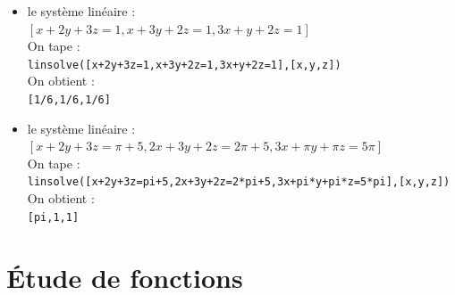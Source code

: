 \documentclass[a4paper,11pt]{book}
\begin{document}
\begin{itemize}
On obtient si on a coch\'e {\tt All\_trig\_sol} dans la configuration du CAS :\\
{\tt [(6*n\_6*pi+pi)/3,(6*n\_6*pi-pi)/3,(6*n\_7*pi+2*pi)/3,\\
(6*n\_7*pi-2*pi)/3,(16*n\_8*pi+pi)/8,(16*n\_8*pi-pi)/8,\\
(16*n\_9*pi+7*pi)/8,(16*n\_9*pi-7*pi)/8,(16*n\_10*pi+3*pi)/8,\\
(16*n\_10*pi-3*pi)/8,(16*n\_11*pi+5*pi)/8,(16*n\_11*pi-5*pi)/8]}
\item le syst\`eme lin\'eaire :\\
$[x+2y+3z=1,x+3y+2z=1,3x+y+2z=1]$\\
On tape :\\
{\tt linsolve([x+2y+3z=1,x+3y+2z=1,3x+y+2z=1],[x,y,z])}\\
On obtient :\\
{\tt [1/6,1/6,1/6]}
\item le syst\`eme lin\'eaire :\\
$[x+2y+3z=\pi+5,2x+3y+2z=2\pi+5,3x+\pi y+\pi z=5\pi]$\\
On tape :\\
{\tt linsolve([x+2y+3z=pi+5,2x+3y+2z=2*pi+5,3x+pi*y+pi*z=5*pi],[x,y,z])}\\
On obtient :\\
{\tt [pi,1,1]}
\end{itemize}

\chapter{\'Etude de fonctions}
\end{document}
